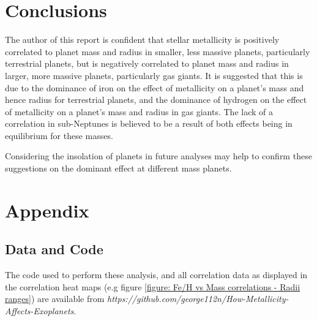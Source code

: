 \documentclass[a4paper,twocolumn,12pt]{article}
\begin{document}
\section{Conclusions}
The author of this report is confident that stellar metallicity is positively correlated to planet mass and radius in smaller, less massive planets, particularly terrestrial planets, but is negatively correlated to planet mass and radius in larger, more massive planets, particularly gas giants. It is suggested that this is due to the dominance of iron on the effect of metallicity on a planet's mass and hence radius for terrestrial planets, and the dominance of hydrogen on the effect of metallicity on a planet's mass and radius in gas giants. The lack of a correlation in sub-Neptunes is believed to be a result of both effects being in equilibrium for these masses.

Considering the insolation of planets in future analyses may help to confirm these suggestions on the dominant effect at different mass planets.

\vspace{-1.5em}
\section{Appendix}

\subsection{Data and Code}
\label{subsection: Code}
The code used to perform these analysis, and all correlation data as displayed in the correlation heat maps (e.g figure \ref{figure: Fe/H vs Mass correlations - Radii ranges}) are available from \textit{https://github.com/george112n/How-Metallicity-Affects-Exoplanets}.









\vspace{-1em}
\footnotesize

\end{document}
